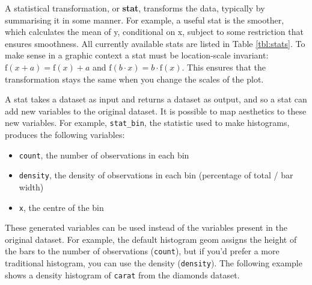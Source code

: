 
A statistical transformation, or \textbf{stat}, transforms the data,
typically by summarising it in some manner. For example, a useful stat
is the smoother, which calculates the mean of y, conditional on x,
subject to some restriction that ensures smoothness. All currently
available stats are listed in Table \ref{tbl:stats}. To make sense in a
graphic context a stat must be location-scale invariant:
\(\mbox{f}(x + a) = \mbox{f}(x) + a\) and
\(\mbox{f}(b \cdot x) = b \cdot \mbox{f}(x)\). This ensures that the
transformation stays the same when you change the scales of the plot.



A stat takes a dataset as input and returns a dataset as output, and so
a stat can add new variables to the original dataset. It is possible to
map aesthetics to these new variables. For example, \texttt{stat\_bin},
the statistic used to make histograms, produces the following variables:
 

\begin{itemize}
\itemsep1pt\parskip0pt
\item
  \texttt{count}, the number of observations in each bin
\item
  \texttt{density}, the density of observations in each bin (percentage
  of total / bar width)
\item
  \texttt{x}, the centre of the bin
\end{itemize}

These generated variables can be used instead of the variables present
in the original dataset. For example, the default histogram geom assigns
the height of the bars to the number of observations (\texttt{count}),
but if you'd prefer a more traditional histogram, you can use the
density (\texttt{density}). The following example shows a density
histogram of \texttt{carat} from the diamonds dataset.

\begin{Shaded}
\begin{Highlighting}[]
\NormalTok{>}\StringTok{ }\StringTok{ }
\NormalTok{+}\StringTok{   }\NormalTok{(}\NormalTok{(}  \NormalTok{)}
\end{Highlighting}
\end{Shaded}

